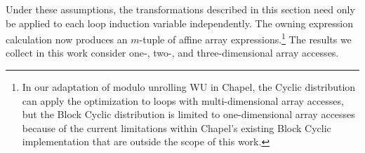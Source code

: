 Under these assumptions, the transformations described in this section need only be applied to each loop induction variable independently. The owning expression calculation now produces an $m$-tuple of affine array expressions.\footnote{In our adaptation of modulo unrolling WU in Chapel, the Cyclic distribution can apply the optimization to loops with multi-dimensional array accesses, but the Block Cyclic distribution is limited to one-dimensional array accesses because of the current limitations within Chapel's existing Block Cyclic implementation that are outside the scope of this work. } The results we collect in this work consider one-, two-, and three-dimensional array accesses. 






